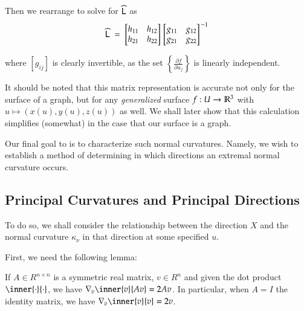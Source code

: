 	Then we rearrange to solve for $\widehat{\mathsf{L}}$ as
		\begin{equation} \label{weinmatconstruction}
		\widehat{\mathsf{L}}
		\;=\; \begin{bmatrix} h_{11} & h_{12} \\ h_{21} & h_{22} \end{bmatrix}
		\left.\begin{bmatrix} g_{11} & g_{12} \\ g_{21} & g_{22} \end{bmatrix}\right.^{-1}
		\end{equation}
	
	where $\left[ g_{ij} \right]$ is clearly invertible, as the set
	$\left\{\frac{\partial f}{\partial u_j}\right\}$ is linearly independent.
	
	It should be noted that this matrix representation is accurate not only for the surface of a graph, but for any \textit{generalized} surface
	$f: U \to \mathbb{R}^3 $ with $u \mapsto (x(u), y(u), z(u))$ as well. We shall later show that this calculation simplifies (somewhat) in the case that our surface is a graph.
	
	
	Our final goal to is to characterize such normal curvatures.
	Namely, we wish to establish a method of determining in which directions an extremal normal curvature occurs.
	
	
	\subsection{Principal Curvatures and Principal Directions}
	To do so, we shall consider the relationship between the direction $X$ and the normal curvature $\kappa_\nu$ in that direction at some specified $u$.


	
	First, we need the following lemma:
    \begin{lemma}
        If $A\in R^{n\times n}$ is a symmetric real matrix, $v \in R^n$
        and given the dot product $\inner{\cdot}{\cdot}$,
        we have $\nabla_{v} \inner{v}{Av} = 2Av$.
        In particular, when $A = I$ the identity matrix, we have
        $ \nabla_{v} \inner{v}{v} = 2v$.
    \end{lemma}
    
